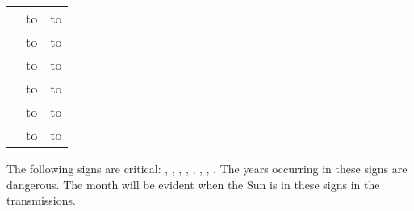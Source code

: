 \begin{longtable}[c]{ccc}
	& \Cancer\xspace to \Gemini		& \Gemini\xspace to \Cancer \\
	& \Leo\xspace to \Taurus				& \Taurus\xspace to \Leo \\
	& \Virgo\xspace to \Aries				& \Aries\xspace to \Virgo \\
	& \Libra\xspace to \Pisces			& \Pisces\xspace to \Libra \\
	& \Scorpio\xspace to \Aquarius	& \Aquarius\xspace to \Scorpio \\
	& \Sagittarius\xspace to \Capricorn	& \Capricorn\xspace to \Aquarius \\
\hline
\end{longtable}

The following signs are critical: \Aries, \Taurus, \Cancer, \Leo, \Libra, \Capricorn, \Scorpio, \Aquarius. The years occurring in these signs are dangerous. The month will be evident when the Sun is in these
signs in the transmissions.

\newpage